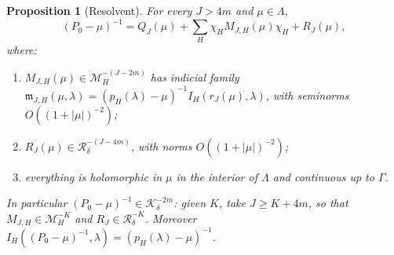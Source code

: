 \documentclass[11pt,oneside,reqno]{article}
\theoremstyle{plain}
\newtheorem{proposition}[theorem]{Proposition}
\theoremstyle{definition}
\theoremstyle{remark}
\begin{document}
\begin{proposition}[Resolvent]\label{prop:resolvent}
For every \(J>4m\) and \(\mu\in\Lambda\),
\[
 (P_0-\mu)^{-1}=Q_J(\mu)+\sum_H\chi_HM_{J,H}(\mu)\chi_H+R_J(\mu),
\]
where:
\begin{enumerate}
\item[(a)] \(M_{J,H}(\mu)\in\mathcal M_H^{-(J-2m)}\) has indicial family
\(\mathfrak m_{J,H}(\mu,\lambda)=(p_H(\lambda)-\mu)^{-1}I_H(r_J(\mu),\lambda)\),
with seminorms \(O((1+|\mu|)^{-2})\);
\item[(b)] \(R_J(\mu)\in\mathcal R^{-(J-4m)}_\delta\), with norms
\(O((1+|\mu|)^{-2})\);
\item[(c)] everything is holomorphic in \(\mu\) in the interior of
\(\Lambda\) and continuous up to \(\Gamma\).
\end{enumerate}
In particular \((P_0-\mu)^{-1}\in\mathcal K^{-2m}_\delta\): given \(K\), take
\(J\geq K+4m\), so that \(M_{J,H}\in\mathcal M^{-K}_H\) and
\(R_J\in\mathcal R^{-K}_\delta\). Moreover
\(I_H((P_0-\mu)^{-1},\lambda)=(p_H(\lambda)-\mu)^{-1}\).
\end{proposition}
\end{document}
